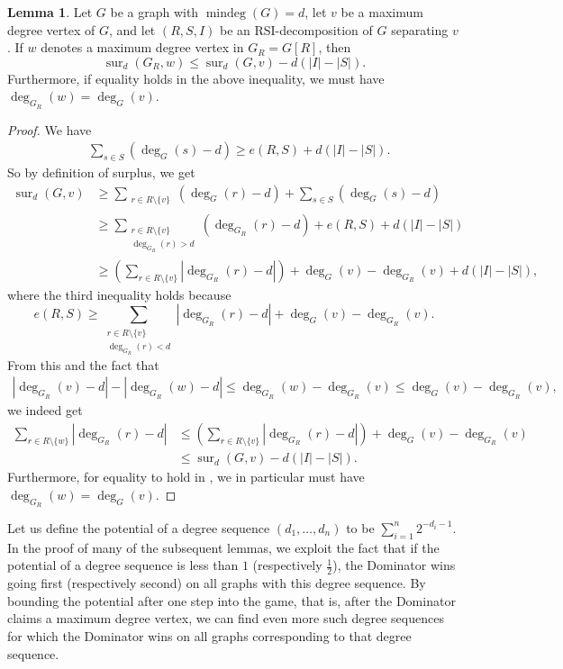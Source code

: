 \documentclass[a4paper,11pt,oneside]{scrartcl}
\theoremstyle{definition}
\newtheorem{lemma}[definition]{Lemma}
\theoremstyle{remark}
\DeclareMathOperator{\mindeg}{mindeg}
\DeclareMathOperator{\sur}{sur}
\newcommand{\surp}[3]{\sur_{#1}(#2,#3)}
\begin{document}
\begin{lemma}\label{lemma:replace_v_by_w_in_R}
    Let $G$ be a graph with $\mindeg(G) = d$, let $v$ be a maximum degree vertex of $G$, and let $(R,S,I)$ be an RSI-decomposition of $G$ separating $v$. If $w$ denotes a maximum degree vertex in $G_R= G[R]$, then
    \[
        \surp{d}{G_R}{w} \leq \surp{d}{G}{v} - d(|I|-|S|).
    \]
    Furthermore, if equality holds in the above inequality, we must have $\deg_{G_R}(w) = \deg_G(v)$. 
\end{lemma}
\begin{proof}
    We have 
    \begin{align*}
        &\sum_{s \in S} (\deg_G(s)-d) \geq e(R,S)+ d(|I|-|S|).
    \end{align*}
    So by definition of surplus, we get
    \begin{align*}
        \surp{d}{G}{v} &\geq \sum_{\substack{r \in R \setminus \{v\}}} (\deg_{G}(r)-d)+\sum_{s \in S} (\deg_G(s)-d)\\ 
        &\geq \sum_{\substack{r \in R \setminus \{v\} \\ \deg_{G_R}(r) > d}} (\deg_{G_R}(r)-d) + e(R,S) + d(|I|-|S|)\\
        &\geq \left(\sum_{r \in R \setminus \{v\}} |\deg_{G_R}(r)-d| \right) +\deg_G(v)-\deg_{G_{R}}(v) + d(|I|-|S|),
    \end{align*}
    where the third inequality holds because
    \[
        e(R,S) \geq \sum_{\substack{r \in R \setminus \{v\} \\ \deg_{G_R}(r) < d}} |\deg_{G_R}(r)-d| + \deg_G(v)-\deg_{G_{R}}(v).
    \]    
    From this and the fact that 
    \begin{align}\label{align:triangle_ineq_for_replacing_v_with_w}
        |\deg_{G_R}(v) - d| - |\deg_{G_R}(w) - d| \leq \deg_{G_R}(w) - \deg_{G_R}(v) \leq \deg_{G}(v) - \deg_{G_R}(v),
    \end{align}
    we indeed get 
    \begin{align*}
        \sum_{r \in R \setminus \{w\}} |\deg_{G_R}(r) - d| &\leq \left(\sum_{r \in R \setminus \{v\}} |\deg_{G_R}(r)-d| \right) +\deg_G(v)-\deg_{G_{R}}(v) \\
        &\leq \surp{d}{G}{v}-d(|I|-|S|). 
    \end{align*}
    Furthermore, for equality to hold in , we in particular must have $\deg_{G_R}(w) = \deg_G(v)$.
\end{proof}

Let us define the potential of a degree sequence $(d_1,\dots,d_n)$ to be $\sum_{i=1}^{n}2^{-d_i-1}$.
In the proof of many of the subsequent lemmas, we exploit the fact that if the potential of a degree sequence is less than $1$ (respectively $\frac12$), the Dominator wins going first (respectively second) on all graphs with this degree sequence. By bounding the potential after one step into the game, that is, after the Dominator claims a maximum degree vertex, we can find even more such degree sequences for which the Dominator wins on all graphs corresponding to that degree sequence. 
\end{document}
